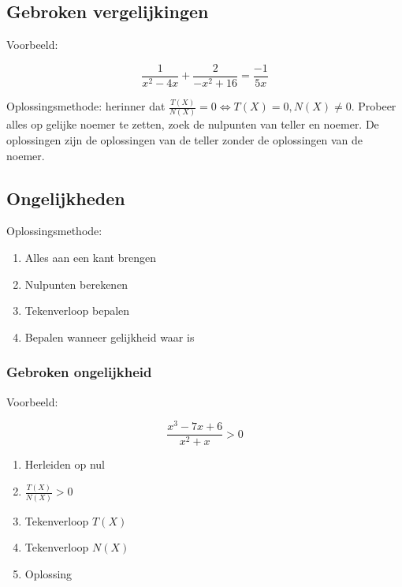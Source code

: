 \subsection{Gebroken vergelijkingen}

Voorbeeld:

\[ \frac{1}{x^2 - 4x} + \frac{2}{-x^2 + 16} = \frac{-1}{5x} \]

Oplossingsmethode: herinner dat \( \frac{T(X)}{N(X)} = 0 \iff T(X) = 0,  N(X) \ne 0 \). Probeer alles op gelijke noemer te zetten, zoek de nulpunten van teller en noemer. De oplossingen zijn de oplossingen van de teller zonder de oplossingen van de noemer.

\subsection{Ongelijkheden}

Oplossingsmethode: 

\begin{enumerate}
	\item Alles aan een kant brengen
	\item Nulpunten berekenen
	\item Tekenverloop bepalen
	\item Bepalen wanneer gelijkheid waar is
\end{enumerate}

\subsubsection{Gebroken ongelijkheid}

Voorbeeld:

\[ \frac{x^3 - 7x + 6}{x^2 + x} > 0 \]

\begin{enumerate}
	\item Herleiden op nul
	\item \( \frac{T(X)}{N(X)} > 0 \)
	\item Tekenverloop \(T(X)\)
	\item Tekenverloop \(N(X)\)
	\item Oplossing
\end{enumerate}
